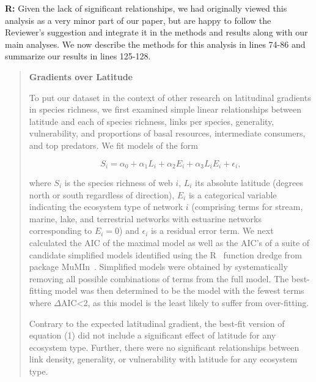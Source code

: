 \documentclass[12pt]{letter}
\begin{document}
  \textbf{R:} Given the lack of significant relationships,
  we had originally viewed this analysis as a very minor 
  part of our paper, but are happy to follow the Reviewer's 
  suggestion and integrate it in the methods and
  results along with our main analyses. We now describe 
  the methods for this analysis in lines 74-86 and 
  summarize our results in lines 125-128.


  \begin{quotation}

    \textbf{Gradients over Latitude}

    To put our dataset in the context of other research on latitudinal gradients in species richness,
    we first examined simple linear relationships between latitude and each of 
    species richness, links per species, generality, vulnerability, and proportions
    of basal resources, intermediate consumers, and top predators. We fit models of the form

    \begin{equation}
    \label{Latfull}
    S_{i} = \alpha_{0} + \alpha_{1} L_{i} + \alpha_{2} E_{i} + \alpha_{3} L_{i} E_{i} + \epsilon_{i} ,
    \end{equation}

    \noindent where $S_{i}$ is the species richness of web $i$, $L_{i}$ its absolute
    latitude (degrees north or south  regardless of direction), $E_{i}$ is a categorical
    variable indicating the ecosystem type of network $i$ (comprising terms for stream, 
    marine, lake, and terrestrial networks with estuarine
    networks corresponding to $E_{i}=0$) and $\epsilon_{i}$ is a residual error term. 
    We next calculated the AIC
    of the maximal model as well as the AIC's of a suite of candidate simplified models identified
    using the R~\cite{R} function dredge from package MuMIn~\cite{MuMIn}. 
    Simplified models were obtained by
    systematically removing all possible combinations of terms from the full model.
    The best-fitting model was then determined to be the model with the fewest terms 
    where $\Delta$AIC\textless2, as this model is the least likely to suffer from over-fitting. 


    \smallskip

    Contrary to the expected latitudinal gradient, the 
    best-fit version of equation (1) did not include a 
    significant effect of latitude for any ecosystem type. 
    Further, there were no significant relationships 
    between link density, generality, or vulnerability with
    latitude for any ecosystem type.

  \end{quotation}
\end{document}
